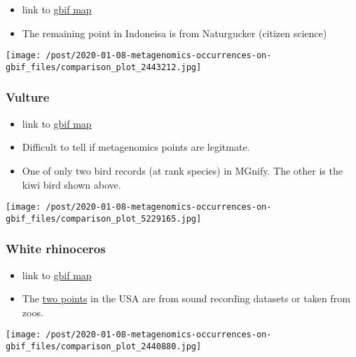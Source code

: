 \documentclass[]{article}
\providecommand{\tightlist}{%
  \setlength{\itemsep}{0pt}\setlength{\parskip}{0pt}}
\begin{document}
\begin{itemize}
\tightlist
\item
  link to
  \href{https://www.gbif.org/occurrence/map?taxon_key=2443212}{gbif map}
\item
  The remaining point in Indoneisa is from Naturgucker (citizen science)
\end{itemize}

\texttt{[image: /post/2020-01-08-metagenomics-occurrences-on-gbif\_files/comparison\_plot\_2443212.jpg]}

\hypertarget{vulture}{%
\subsubsection{Vulture}\label{vulture}}

\begin{itemize}
\tightlist
\item
  link to
  \href{https://www.gbif.org/occurrence/gallery?taxon_key=5229165}{gbif
  map}
\item
  Difficult to tell if {metagenomics points} are legitmate.
\item
  One of only two bird records (at rank species) in MGnify. The other is
  the kiwi bird shown above.
\end{itemize}

\texttt{[image: /post/2020-01-08-metagenomics-occurrences-on-gbif\_files/comparison\_plot\_5229165.jpg]}

\hypertarget{white-rhinoceros}{%
\subsubsection{White rhinoceros}\label{white-rhinoceros}}

\begin{itemize}
\tightlist
\item
  link to
  \href{https://www.gbif.org/occurrence/map?taxon_key=2440880}{gbif map}
\item
  The
  \href{https://www.gbif.org/occurrence/search?has_coordinate=true\&taxon_key=2440880\&advanced=1\&geometry=POLYGON((-112.41211\%2025.48828,-73.91602\%2025.48828,-73.91602\%2045.17578,-112.41211\%2045.17578,-112.41211\%2025.48828))}{two
  points} in the USA are from sound recording datasets or taken from
  zoos.
\end{itemize}

\texttt{[image: /post/2020-01-08-metagenomics-occurrences-on-gbif\_files/comparison\_plot\_2440880.jpg]}
\end{document}
